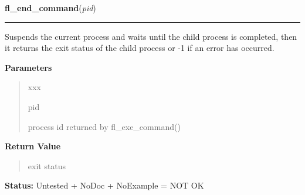 \hspace{.8\funcindent}\begin{boxedminipage}{\funcwidth}

    \raggedright \textbf{fl\_end\_command}(\textit{pid})

    \vspace{-1.5ex}

    \rule{\textwidth}{0.5\fboxrule}
\setlength{\parskip}{2ex}
    Suspends the current process and waits until the child process is 
    completed, then it returns the exit status of the child process or -1 
    if an error has occurred.

\setlength{\parskip}{1ex}
      \textbf{Parameters}
      \vspace{-1ex}

      \begin{quote}
        \begin{Ventry}{xxx}

          \item[pid]

          process id returned by fl\_exe\_command()

        \end{Ventry}

      \end{quote}

      \textbf{Return Value}
    \vspace{-1ex}

      \begin{quote}
      exit status

      \end{quote}

\textbf{Status:} Untested + NoDoc + NoExample = NOT OK



    \end{boxedminipage}

    \label{xformslib:library:fl_end_command}

    \vspace{0.5ex}

